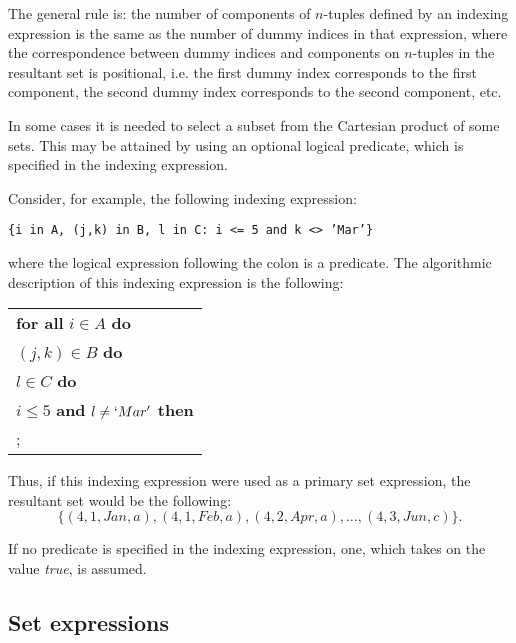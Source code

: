 \documentclass[10pt]{article}
\begin{document}
The general rule is: the number of components of $n$-tuples defined by
an indexing expression is the same as the number of dummy indices in
that expression, where the correspondence between dummy indices and
components on $n$-tuples in the resultant set is positional, i.e. the
first dummy index corresponds to the first component, the second dummy
index corresponds to the second component, etc.

In some cases it is needed to select a subset from the Cartesian
product of some sets. This may be attained by using an optional logical
predicate, which is specified in the indexing expression.

Consider, for example, the following indexing expression:

\medskip

\noindent\hfil
{\tt\{i in A, (j,k) in B, l in C: i <= 5 and k <> 'Mar'\}}

\medskip

\noindent where the logical expression following the colon is a
predicate. The algorithmic description of this indexing expression is
the following:

\medskip

\noindent\hfil
\begin{tabular}{@{}l@{}}
{\bf for all} $i\in A$ {\bf do}\\
\hspace{12pt}{\bf for all} $(j,k)\in B$ {\bf do}\\
\hspace{24pt}{\bf for all} $l\in C$ {\bf do}\\
\hspace{36pt}{\bf if} $i\leq 5$ {\bf and} $l\neq`Mar'$ {\bf then}\\
\hspace{48pt}{\it action};\\
\end{tabular}

\medskip

\noindent Thus, if this indexing expression were used as a primary set
expression, the resultant set would be the following:
$$\{(4,1,Jan,a),(4,1,Feb,a),(4,2,Apr,a),\dots,(4,3,Jun,c)\}.$$

If no predicate is specified in the indexing expression, one, which
takes on the value {\it true}, is assumed.

\subsection{Set expressions}
\end{document}
